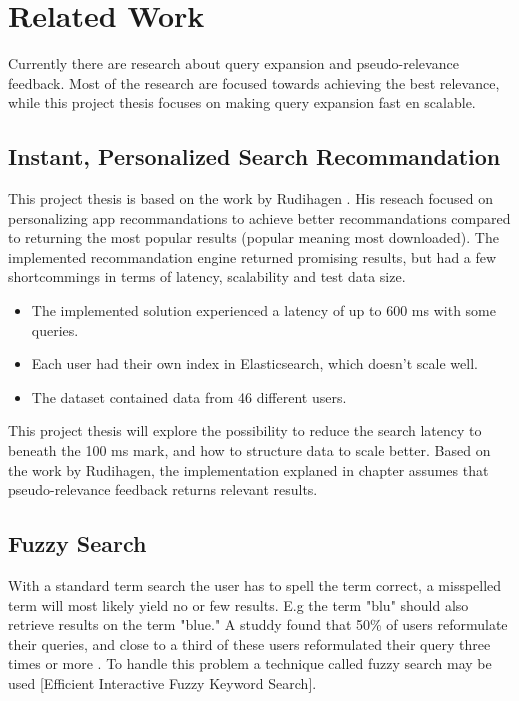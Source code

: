 \chapter{Related Work}
\label{ch:related-work}
Currently there are research about query expansion and pseudo-relevance feedback.
Most of the research are focused towards achieving the best relevance,
while this project thesis focuses on making query expansion fast en scalable.

\section{Instant, Personalized Search Recommandation}
This project thesis is based on the work by Rudihagen \cite{master-thesis}.
His reseach focused on personalizing app recommandations to achieve better recommandations compared to returning the most popular results (popular meaning most downloaded).
The implemented recommandation engine returned promising results, but had a few shortcommings in terms of latency, scalability and test data size.

\begin{itemize}
  \item The implemented solution experienced a latency of up to 600 ms with some queries.
  \item Each user had their own index in Elasticsearch, which doesn't scale well.
  \item The dataset contained data from 46 different users.
\end{itemize}

This project thesis will explore the possibility to reduce the search latency to beneath the 100 ms mark, and how to structure data to scale better.
Based on the work by Rudihagen,
the implementation explaned in chapter \cite{ch:approach} assumes that pseudo-relevance feedback returns relevant results.

\section{Fuzzy Search}
With a standard term search the user has to spell the term correct, a misspelled term will most likely yield no or few results.
E.g the term "blu" should also retrieve results on the term "blue."
A studdy found that 50\% of users reformulate their queries, and close to a third of these users reformulated their query three times or more \cite{query-reformulate}.
To handle this problem a technique called fuzzy search may be used [Efficient Interactive Fuzzy Keyword Search].

